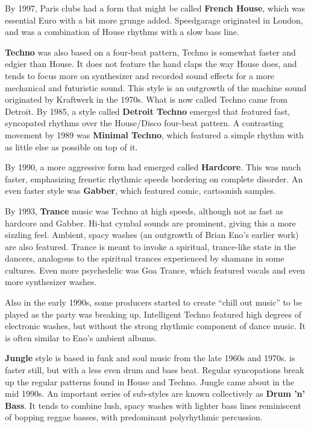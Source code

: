 By 1997, Paris clubs had a form that might be called \textbf{French House}, which was essential Euro with a bit more grunge added. Speedgarage originated in London, and was a combination of House rhythms with a slow bass line.

\textbf{Techno} was also based on a four-beat pattern, Techno is somewhat faster and edgier than House. It does not feature the hand claps the way House does, and tends to focus more on synthesizer and recorded sound effects for a more mechanical and futuristic sound.
This style is an outgrowth of the machine sound originated by Kraftwerk in the 1970s. What is now called Techno came from Detroit. By 1985, a style called \textbf{Detroit Techno} emerged that featured fast, syncopated rhythms over the House/Disco four-beat pattern. A contrasting movement by 1989 was \textbf{Minimal Techno}, which featured a simple rhythm with as little else as possible on top of it.

By 1990, a more aggressive form had emerged called \textbf{Hardcore}. This was much faster, emphasizing frenetic rhythmic speeds bordering on complete disorder. An even faster style was \textbf{Gabber}, which featured comic, cartoonish samples.

By 1993, \textbf{Trance} music was Techno at high speeds, although not as fast as hardcore and Gabber. Hi-hat cymbal sounds are prominent, giving this a more sizzling feel. Ambient, spacy washes (an outgrowth of Brian Eno's earlier work) are also featured. Trance is meant to invoke a spiritual, trance-like state in the dancers, analogous to the spiritual trances experienced by shamans in some cultures. Even more psychedelic was Goa Trance, which featured vocals and even more synthesizer washes.

Also in the early 1990s, some producers started to create ``chill out music'' to be played as the party was breaking up. Intelligent Techno featured high degrees of electronic washes, but without the strong rhythmic component of dance music. It is often similar to Eno's ambient albums.

\textbf{Jungle} style is based in funk and soul music from the late 1960s and 1970s. is faster still, but with a less even drum and bass beat. Regular syncopations break up the regular patterns found in House and Techno. Jungle came about in the mid 1990s. An important series of sub-styles are known collectively as \textbf{Drum 'n' Bass}. It tends to combine lush, spacy washes with lighter bass lines reminiscent of bopping reggae basses, with predominant polyrhythmic percussion.

